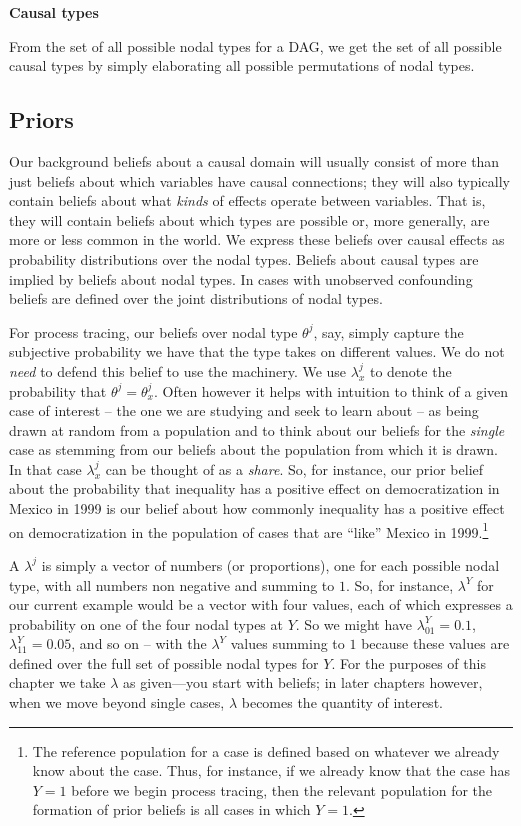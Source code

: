 \documentclass[
  12pt,
]{book}
\begin{document}
\textbf{Causal types}

From the set of all possible nodal types for a DAG, we get the set of all possible causal types by simply elaborating all possible permutations of nodal types.

\hypertarget{priors}{%
\subsection{Priors}\label{priors}}

Our background beliefs about a causal domain will usually consist of more than just beliefs about which variables have causal connections; they will also typically contain beliefs about what \emph{kinds} of effects operate between variables. That is, they will contain beliefs about which types are possible or, more generally, are more or less common in the world. We express these beliefs over causal effects as probability distributions over the nodal types. Beliefs about causal types are implied by beliefs about nodal types. In cases with unobserved confounding beliefs are defined over the joint distributions of nodal types.

For process tracing, our beliefs over nodal type \(\theta^j\), say, simply capture the subjective probability we have that the type takes on different values. We do not \emph{need} to defend this belief to use the machinery. We use \(\lambda^j_x\) to denote the probability that \(\theta^j = \theta^j_x\). Often however it helps with intuition to think of a given case of interest -- the one we are studying and seek to learn about -- as being drawn at random from a population and to think about our beliefs for the \emph{single} case as stemming from our beliefs about the population from which it is drawn. In that case \(\lambda^j_x\) can be thought of as a \emph{share}. So, for instance, our prior belief about the probability that inequality has a positive effect on democratization in Mexico in 1999 is our belief about how commonly inequality has a positive effect on democratization in the population of cases that are ``like'' Mexico in 1999.\footnote{The reference population for a case is defined based on whatever we already know about the case. Thus, for instance, if we already know that the case has \(Y=1\) before we begin process tracing, then the relevant population for the formation of prior beliefs is all cases in which \(Y=1\).}

A \(\lambda^j\) is simply a vector of numbers (or proportions), one for each possible nodal type, with all numbers non negative and summing to \(1\). So, for instance, \(\lambda^Y\) for our current example would be a vector with four values, each of which expresses a probability on one of the four nodal types at \(Y\). So we might have \(\lambda^Y_{01}=0.1\), \(\lambda^Y_{11}=0.05\), and so on -- with the \(\lambda^Y\) values summing to \(1\) because these values are defined over the full set of possible nodal types for \(Y\). For the purposes of this chapter we take \(\lambda\) as given---you start with beliefs; in later chapters however, when we move beyond single cases, \(\lambda\) becomes the quantity of interest.
\end{document}
